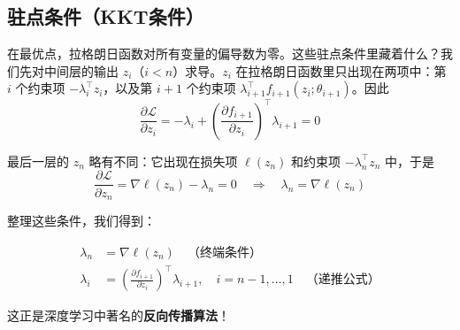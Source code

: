 
\subsection{驻点条件（KKT条件）}

在最优点，拉格朗日函数对所有变量的偏导数为零。这些驻点条件里藏着什么？我们先对中间层的输出 $z_i$（$i < n$）求导。$z_i$ 在拉格朗日函数里只出现在两项中：第 $i$ 个约束项 $-\lambda_i^\top z_i$，以及第 $i+1$ 个约束项 $\lambda_{i+1}^\top f_{i+1}(z_i; \theta_{i+1})$。因此
\begin{equation}
\frac{\partial \mathcal{L}}{\partial z_i} = -\lambda_i + \left(\frac{\partial f_{i+1}}{\partial z_i}\right)^\top \lambda_{i+1} = 0
\end{equation}

最后一层的 $z_n$ 略有不同：它出现在损失项 $\ell(z_n)$ 和约束项 $-\lambda_n^\top z_n$ 中，于是
\begin{equation}
\frac{\partial \mathcal{L}}{\partial z_n} = \nabla \ell(z_n) - \lambda_n = 0 \quad \Rightarrow \quad \lambda_n = \nabla \ell(z_n)
\end{equation}

整理这些条件，我们得到：

\begin{keytheorem}[title=伴随方程（反向传播公式）]
\begin{equation}
\boxed{
\begin{aligned}
\lambda_n &= \nabla \ell(z_n) \quad \text{（终端条件）} \\[5pt]
\lambda_i &= \left(\frac{\partial f_{i+1}}{\partial z_i}\right)^\top \lambda_{i+1}, \quad i = n-1, \ldots, 1 \quad \text{（递推公式）}
\end{aligned}
}
\end{equation}

这正是深度学习中著名的\textbf{反向传播算法}！
\end{keytheorem}

